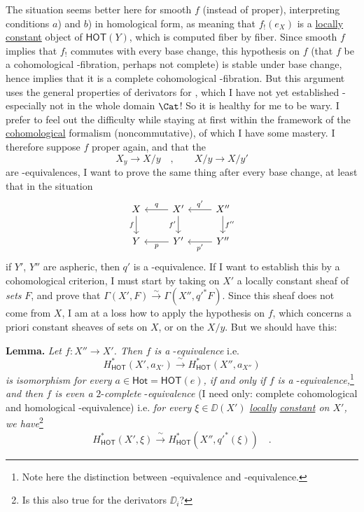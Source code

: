 The situation seems better here for smooth $f$ (instead of proper), interpreting conditions $a$) and $b$) in homological form, as meaning that $f_!(e_X)$ is a \underline{locally} \underline{constant} object of $\mathsf{HOT}(Y)$, which is computed fiber by fiber. Since smooth $f$ implies that $f_!$ commutes with every base change, this hypothesis on $f$ (that $f$ be a cohomological \HOT-fibration, perhaps not complete) is stable under base change, hence implies that it is a complete cohomological \HOT-fibration. But this argument uses the general properties of derivators for \HOT, which I have not yet established - especially not in the whole domain $\Cat$! So it is healthy for me to be wary. I prefer to feel out the difficulty while staying at first within the framework of the \underline{cohomological} formalism (noncommutative), of which I have some mastery. I therefore suppose $f$ proper again, and that the %
\[ X_y \longrightarrow X/y \quad , \qquad X/y \longrightarrow X/y' \]
are \HOT-equivalences, I want to prove the same thing after every base change, at least that in the situation
\[
\begin{tikzcd}
X \arrow[r, leftarrow, "q"] \arrow[d, "f"'] & X' \arrow[r, leftarrow, "q'"] \arrow[d, "f'"'] & X'' \arrow[d, "f''"] \\
Y \arrow[r, leftarrow, "p"'] & Y' \arrow[r, leftarrow, "p'"'] & Y''
\end{tikzcd}
\]
if $Y'$, $Y''$ are aspheric, then $q'$ is a \Hot-equivalence. If I want to establish this by a cohomological criterion, I must start by taking on $X'$ a locally constant sheaf of \textit{sets} $F$, and prove that $\Gamma(X',F) \overset{\sim}{\to} \Gamma(X'',{q'}^{*}F)$. Since this sheaf does not come from $X$, I am at a loss how to apply the hypothesis on $f$, which concerns a priori constant sheaves of sets on $X$, or on the $X/y$. But we should have this:

\textbf{Lemma.} \textit{Let $f : X'' \to X'$. Then $f$ is a} \HOT-\textit{equivalence} i.e.
\[ H^{*}_{\mathsf{HOT}}(X', a_{X'}) \xrightarrow{\ \sim\ } H^{*}_{\mathsf{HOT}}(X'', a_{X''}) \]
\textit{is} \textit{isomorphism for every $a \in \mathsf{Hot} = \mathsf{HOT}(e)$, if and only if $f$ is a} \Hot-\textit{equivalence,}\footnote[56]{Note here the distinction between \HOT-equivalence and \Hot-equivalence.} \textit{and then $f$ is even a} $2$-\textit{complete} \HOT-\textit{equivalence} (I need only: complete cohomological and homological \HOT-equivalence) i.e. \textit{for every $\xi \in \DD(X')$ \underline{locally} \underline{constant} on $X'$, we have}\footnote[57]{Is this also true for the derivators $\DD_i$?}
\[ H^{*}_{\mathsf{HOT}}(X',\xi) \xrightarrow{\ \sim\ } H^{*}_{\mathsf{HOT}}(X'',{q'}^{*}(\xi)) \quad . \]

